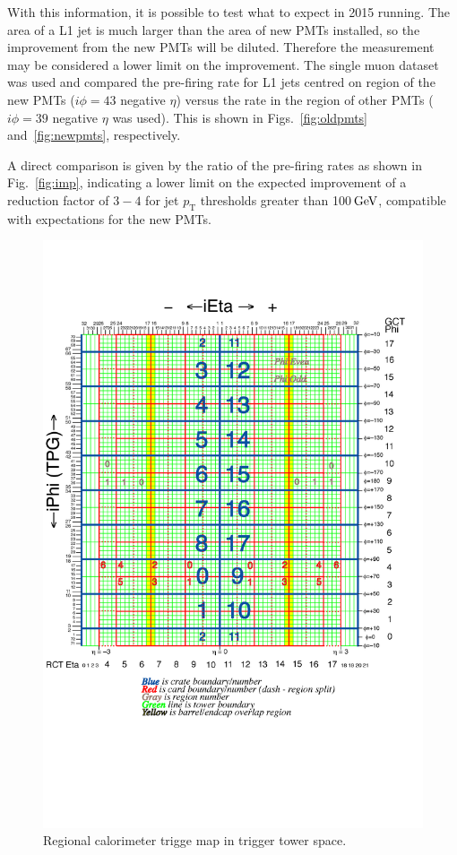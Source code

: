 \documentclass[11pt]{cmspaperpdf}
\newcommand{\GeV}{\ensuremath{\,\text{Ge\hspace{-.08em}V}}\xspace}
\newcommand{\pt}{\ensuremath{p_{\mathrm{T}}}\xspace}
\begin{document}
With this information, it is possible to test what to expect in 2015 running. The area of a L1 jet is much larger than the area of new PMTs installed, so the improvement from the new PMTs will be diluted. Therefore the measurement may be considered a lower limit on the improvement. The single muon dataset was used and compared the pre-firing rate for L1 jets centred on region of the new PMTs ($i \phi=43$ negative $\eta$) versus the rate in the region of other PMTs ($i \phi=39$ negative $\eta$ was used). This is shown in Figs.~\ref{fig:oldpmts} and~\ref{fig:newpmts}, respectively.

A direct comparison is given by the ratio of the pre-firing rates as shown in Fig.~\ref{fig:imp}, indicating a lower limit on the expected improvement of a reduction factor of $3-4$ for jet \pt thresholds greater than 100\GeV, compatible with expectations for the new PMTs.

\begin{figure}
\centering
\includegraphics[scale=0.23]{plots/towers_ieta_iphi_2009.png}
\caption{Regional calorimeter trigge map in trigger tower space.} 
\end{figure}
\vspace{5mm}
\end{document}
